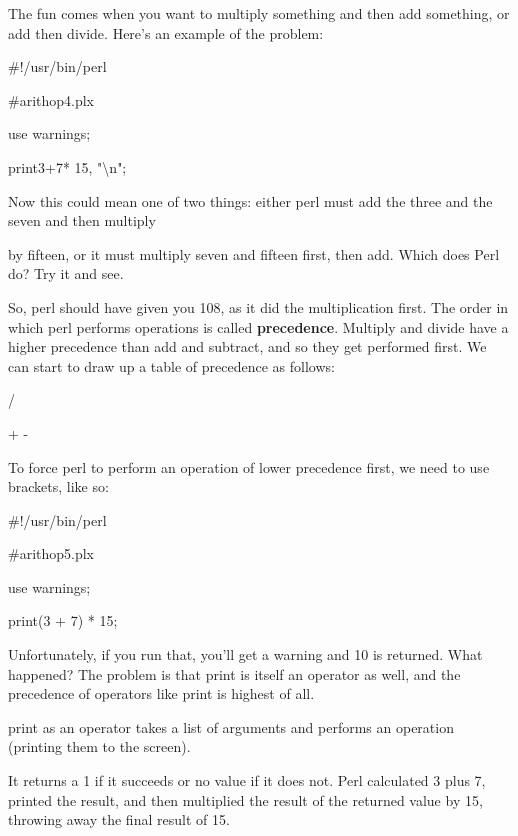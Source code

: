 \documentclass[a4paper,11pt]{book}
\begin{document}
\noindent 

\noindent The fun comes when you want to multiply something and then add something, or add then divide. Here's an example of the problem:

\noindent 

\noindent \#!/usr/bin/perl

\noindent \#arithop4.plx

\noindent use warnings;

\noindent print3+7* 15, "\textbackslash n";

\noindent 

\noindent Now this could mean one of two things: either perl must add the three and the seven and then multiply

\noindent by fifteen, or it must multiply seven and fifteen first, then add. Which does Perl do? Try it and see.

\noindent 

\noindent So, perl should have given you 108, as it did the multiplication first. The order in which perl performs operations is called \textbf{precedence}. Multiply and divide have a higher precedence than add and subtract, and so they get performed first. We can start to draw up a table of precedence as follows:

\noindent 

\noindent * /

\noindent 

\noindent + -

\noindent 

\noindent To force perl to perform an operation of lower precedence first, we need to use brackets, like so:

\noindent 

\noindent \#!/usr/bin/perl

\noindent \#arithop5.plx

\noindent use warnings;

\noindent print(3 + 7) * 15;

\noindent 

\noindent Unfortunately, if you run that, you'll get a warning and 10 is returned. What happened? The problem is that print is itself an operator as well, and the precedence of operators like print is highest of all.

\noindent 

\noindent print as an operator takes a list of arguments and performs an operation (printing them to the screen).

\noindent It returns a 1 if it succeeds or no value if it does not. Perl calculated 3 plus 7, printed the result, and then multiplied the result of the returned value by 15, throwing away the final result of 15.
\end{document}
